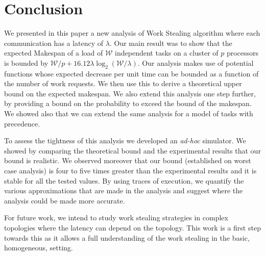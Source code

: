 \documentclass[a4paper,fleqn]{cas-sc}
\newcommand\calW{\mathcal{W}}
\begin{document}
\maketitle






\section{Conclusion}
\label{sec:conclusion}

We presented in this paper a new analysis of Work Stealing algorithm
where each communication has a latency of $\lambda$.  Our main result
was to show that the expected Makespan of a load of $\calW$ independent
tasks on a cluster of $p$ processors is bounded by
$\calW/p+16.12\lambda\log_2(\calW/\lambda)$. Our analysis makes use of
potential functions whose expected decrease per unit time can be
bounded as a function of the number of work requests. We then use this
to derive a theoretical upper bound on the expected makespan. We also
extend this analysis one step further, by providing a bound on the
probability to exceed the bound of the makespan.  We showed also that
we can extend the same analysis for a model of tasks with precedence.

To assess the tightness of this analysis we developed an
\textit{ad-hoc} simulator. We showed by comparing the theoretical
bound and the experimental results that our bound is realistic.  We
observed moreover that our bound (established on worst case analysis)
is four to five times greater than the experimental results and it is
stable for all the tested values. By using traces of execution, we
quantify the various approximations that are made in the analysis and
suggest where the analysis could be made more accurate.

For future work, we intend to study work stealing strategies in
complex topologies where the latency can depend on the topology.  This
work is a first step towards this as it allows a full understanding of
the work stealing in the basic, homogeneous, setting.






%




%
%


\appendix


\end{document}
